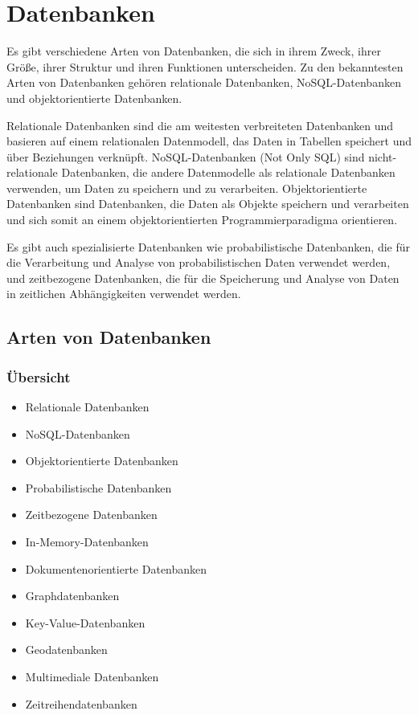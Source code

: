 \chapter{Datenbanken}

Es gibt verschiedene Arten von Datenbanken, die sich in ihrem Zweck, ihrer Größe, ihrer Struktur und ihren Funktionen unterscheiden. Zu den bekanntesten Arten von Datenbanken gehören relationale Datenbanken, NoSQL-Datenbanken und objektorientierte Datenbanken.

Relationale Datenbanken sind die am weitesten verbreiteten Datenbanken und basieren auf einem relationalen Datenmodell, das Daten in Tabellen speichert und über Beziehungen verknüpft. NoSQL-Datenbanken (Not Only SQL) sind nicht-relationale Datenbanken, die andere Datenmodelle als relationale Datenbanken verwenden, um Daten zu speichern und zu verarbeiten. Objektorientierte Datenbanken sind Datenbanken, die Daten als Objekte speichern und verarbeiten und sich somit an einem objektorientierten Programmierparadigma orientieren.

Es gibt auch spezialisierte Datenbanken wie probabilistische Datenbanken, die für die Verarbeitung und Analyse von probabilistischen Daten verwendet werden, und zeitbezogene Datenbanken, die für die Speicherung und Analyse von Daten in zeitlichen Abhängigkeiten verwendet werden.


\section{Arten von Datenbanken}
\subsection{Übersicht}
\begin{itemize}
\item	Relationale Datenbanken
\item	NoSQL-Datenbanken
\item 	Objektorientierte Datenbanken
\item	Probabilistische Datenbanken
\item	Zeitbezogene Datenbanken
\item	In-Memory-Datenbanken
\item	Dokumentenorientierte Datenbanken
\item	Graphdatenbanken
\item	Key-Value-Datenbanken
\item	Geodatenbanken
\item	Multimediale Datenbanken
\item	Zeitreihendatenbanken
\end{itemize}

